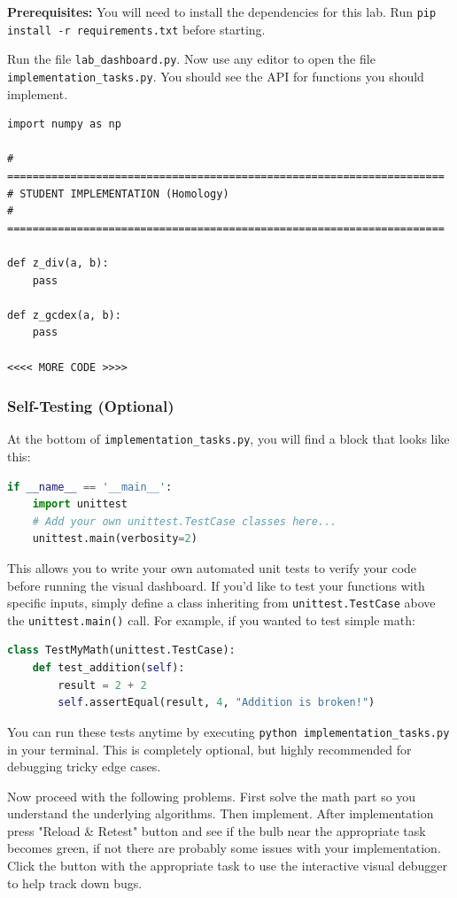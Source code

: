 \documentclass[11pt]{article}
\begin{document}
\textbf{Prerequisites:} You will need to install the dependencies for this lab. Run \lstinline|pip install -r requirements.txt| before starting.

Run the file \lstinline|lab_dashboard.py|. Now use any editor to open the file \lstinline|implementation_tasks.py|. You should see the API for functions you should implement.

\begin{lstlisting}
import numpy as np

# =====================================================================
# STUDENT IMPLEMENTATION (Homology)
# =====================================================================

def z_div(a, b):
    pass

def z_gcdex(a, b):
    pass

<<<< MORE CODE >>>>
\end{lstlisting}

\subsubsection*{Self-Testing (Optional)}
At the bottom of \lstinline|implementation_tasks.py|, you will find a block that looks like this:
\begin{lstlisting}[language=Python]
if __name__ == '__main__':
    import unittest
    # Add your own unittest.TestCase classes here...
    unittest.main(verbosity=2)
\end{lstlisting}
This allows you to write your own automated unit tests to verify your code before running the visual dashboard. If you'd like to test your functions with specific inputs, simply define a class inheriting from \lstinline|unittest.TestCase| above the \lstinline|unittest.main()| call. For example, if you wanted to test simple math:
\begin{lstlisting}[language=Python]
class TestMyMath(unittest.TestCase):
    def test_addition(self):
        result = 2 + 2
        self.assertEqual(result, 4, "Addition is broken!")
\end{lstlisting}
You can run these tests anytime by executing \lstinline|python implementation_tasks.py| in your terminal. This is completely optional, but highly recommended for debugging tricky edge cases.

Now proceed with the following problems. First solve the math part so you understand the underlying algorithms. Then implement. After implementation press "Reload \& Retest" button and see if the bulb near the appropriate task becomes green, if not there are probably some issues with your implementation. Click the button with the appropriate task to use the interactive visual debugger to help track down bugs.
\end{document}
